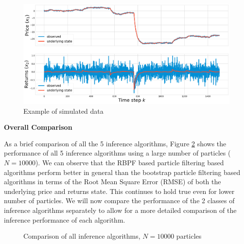 \documentclass[../main.tex]{subfiles}
\begin{document}
\begin{figure}[h!]
	\centering
	\includegraphics[width=15.0cm]{../plots/4__1__1__simulated.png}
	\caption{Example of simulated data}
	\label{fig:4__1__1__simulated}
\end{figure}

\textbf{Overall Comparison}

As a brief comparison of all the 5 inference algorithms, Figure \ref{fig:4__1__comparison} shows the performance of all 5 inference algorithms using a large number of particles ($N=10000$). We can observe that the RBPF based particle filtering based algorithms perform better in general than the bootstrap particle filtering based algorithms in terms of the Root Mean Square Error (RMSE) of both the underlying price and returns state. This continues to hold true even for lower number of particles. We will now compare the performance of the 2 classes of inference algorithms separately to allow for a more detailed comparison of the inference performance of each algorithm.

\begin{figure}[h!]
	\centering
	\qquad
	\caption{Comparison of all inference algorithms, $N = 10000$ particles}
	\label{fig:4__1__comparison}
\end{figure}
\end{document}
